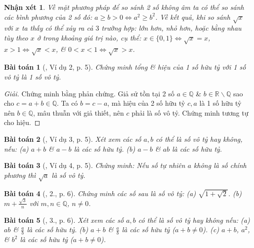 \documentclass{article}
\newtheorem{baitoan}{Bài toán}
\newtheorem{nhanxet}{Nhận xét}
\begin{document}
\begin{nhanxet}
	Về mặt phương pháp để so sánh 2 số không âm ta có thể so sánh các bình phương của 2 số đó: $a\ge b > 0\Leftrightarrow a^2\ge b^2$. Về kết quả, khi so sánh $\sqrt{x}$ với $x$ ta thấy có thể xảy ra cả $3$ trường hợp: lớn hơn, nhỏ hơn, hoặc bằng nhau tùy theo $x$ ở trong khoảng giá trị nào, cụ thể: $x\in\{0,1\}\Leftrightarrow\sqrt{x} = x$, $x > 1\Leftrightarrow\sqrt{x} < x$, \& $0 < x < 1\Leftrightarrow\sqrt{x} > x$.
\end{nhanxet}

\begin{baitoan}[\cite{Binh_Toan_9_tap_1}, Ví dụ 2, p. 5]
	Chứng minh tổng \& hiệu của 1 số hữu tỷ với 1 số vô tỷ là 1 số vô tỷ.
\end{baitoan}

\begin{proof}[Giải]
	Chứng minh bằng phản chứng. Giả sử tồn tại 2 số $a\in\mathbb{Q}$ \& $b\in\mathbb{R}\backslash\mathbb{Q}$ sao cho $c = a + b\in\mathbb{Q}$. Ta có $b = c - a$, mà hiệu của 2 số hữu tỷ $c,a$ là 1 số hữu tỷ nên $b\in\mathbb{Q}$, mâu thuẫn với giả thiết, nên $c$ phải là số vô tỷ. Chứng minh tương tự cho hiệu.
\end{proof}

\begin{baitoan}[\cite{Binh_Toan_9_tap_1}, Ví dụ 3, p. 5]
	Xét xem các số $a,b$ có thể là số vô tỷ hay không, nếu: (a) $a + b$ \& $a - b$ là các số hữu tỷ. (b) $a - b$ \& $ab$ là các số hữu tỷ.
\end{baitoan}

\begin{baitoan}[\cite{Binh_Toan_9_tap_1}, Ví dụ 4, p. 5]
	Chứng minh: Nếu số tự nhiên $a$ không là số chính phương thì $\sqrt{a}$ là số vô tỷ.
\end{baitoan}

\begin{baitoan}[\cite{Binh_Toan_9_tap_1}, 2., p. 6]
	Chứng minh các số sau là số vô tỷ: (a) $\sqrt{1 + \sqrt{2}}$. (b) $m + \frac{\sqrt{3}}{n}$ với $m,n\in\mathbb{Q}$, $n\ne0$.
\end{baitoan}

\begin{baitoan}[\cite{Binh_Toan_9_tap_1}, 3., p. 6]
	Xét xem các số $a,b$ có thể là số vô tỷ hay không nếu: (a) $ab$ \& $\frac{a}{b}$ là các số hữu tỷ. (b) $a + b$ \& $\frac{a}{b}$ là các số hữu tỷ ($a + b\ne0$). (c) $a + b$, $a^2$, \& $b^2$ là các số hữu tỷ ($a + b\ne0$).
\end{baitoan}
\end{document}

